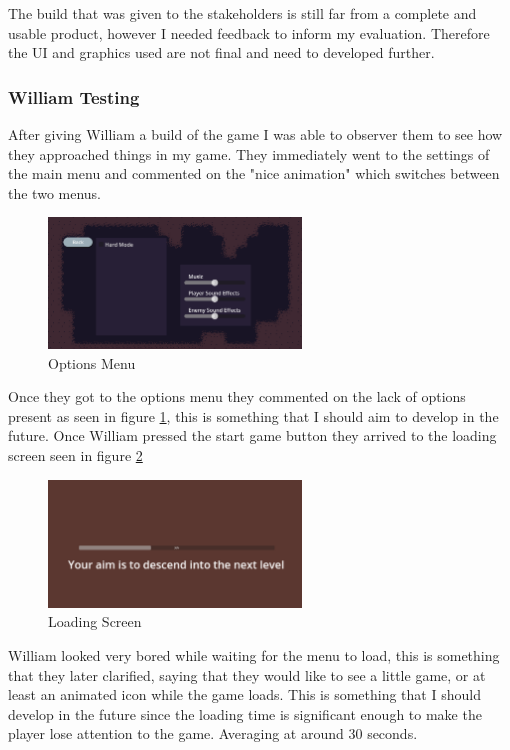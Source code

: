 \documentclass{article}
\newcommand{\parBr}{\vspace{5mm}}%
\begin{document}
\parBr

The build that was given to the stakeholders is still far from a complete and usable product, however I needed feedback to inform my evaluation. Therefore the UI and graphics used are not final and need to developed further.

\subsubsection{William Testing}
After giving William a build of the game I was able to observer them to see how they approached things in my game. They immediately went to the settings of the main menu and commented on the "nice animation" which switches between the two menus.

\begin{figure}[H]
\centering
\includegraphics[width=0.6\textwidth]{options}
\caption{Options Menu}
\label{options_men}
\end{figure}

Once they got to the options menu they commented on the lack of options present as seen in figure \ref{options_men}, this is something that I should aim to develop in the future. Once William pressed the start game button they arrived to the loading screen seen in figure \ref{load_men}

\begin{figure}[H]
\centering
\includegraphics[width=0.6\textwidth]{load menu}
\caption{Loading Screen}
\label{load_men}
\end{figure}

William looked very bored while waiting for the menu to load, this is something that they later clarified, saying that they would like to see a little game, or at least an animated icon while the game loads. This is something that I should develop in the future since the loading time is significant enough to make the player lose attention to the game. Averaging at around 30 seconds.
\end{document}
